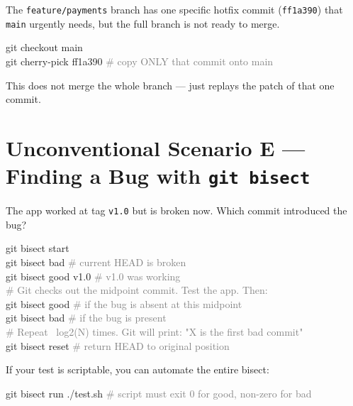 \documentclass[10pt,a4paper]{article}
\newenvironment{codebox}{%
  \begin{mdframed}[backgroundcolor=codebg, linewidth=0pt,
    innerleftmargin=6pt, innerrightmargin=6pt,
    innertopmargin=4pt, innerbottommargin=4pt]%
  \small\ttfamily
}{%
  \end{mdframed}%
}
\begin{document}
The \texttt{feature/payments} branch has one specific hotfix commit (\texttt{ff1a390})
that \texttt{main} urgently needs, but the full branch is not ready to merge.

\begin{codebox}
git checkout main\\
git cherry-pick ff1a390     \textcolor{gray}{\# copy ONLY that commit onto main}
\end{codebox}

This does not merge the whole branch --- just replays the patch of that one commit.

\section{Unconventional Scenario E --- Finding a Bug with \texttt{git bisect}}

The app worked at tag \texttt{v1.0} but is broken now. Which commit introduced the bug?

\begin{codebox}
git bisect start\\
git bisect bad                  \textcolor{gray}{\# current HEAD is broken}\\
git bisect good v1.0            \textcolor{gray}{\# v1.0 was working}\\
\textcolor{gray}{\# Git checks out the midpoint commit. Test the app. Then:}\\
git bisect good                 \textcolor{gray}{\# if the bug is absent at this midpoint}\\
git bisect bad                  \textcolor{gray}{\# if the bug is present}\\
\textcolor{gray}{\# Repeat ~log2(N) times. Git will print: "X is the first bad commit"}\\
git bisect reset                \textcolor{gray}{\# return HEAD to original position}
\end{codebox}

If your test is scriptable, you can automate the entire bisect:

\begin{codebox}
git bisect run ./test.sh        \textcolor{gray}{\# script must exit 0 for good, non-zero for bad}
\end{codebox}

\end{document}
